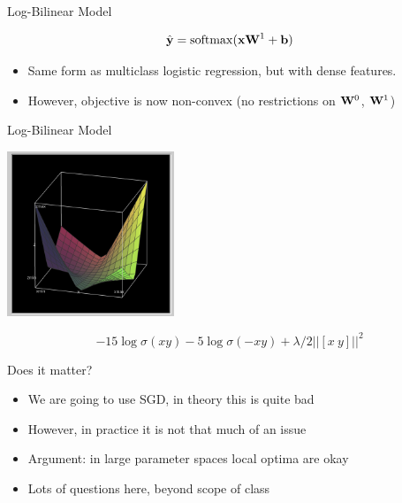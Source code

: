 \documentclass{beamer}
\begin{document}
\begin{frame}{Log-Bilinear Model}


  \[ \hat{\boldy} =  \softmax (\boldx \boldW^1 + \boldb) \]

  \begin{itemize}
  \item Same form as multiclass logistic regression, but with dense features.
  \item However, objective is now non-convex (no restrictions on $\mathbf{W}^0$, $\mathbf{W}^1$)
  \end{itemize}
\end{frame}

\begin{frame}{Log-Bilinear Model}
  \begin{center}
    \includegraphics[width=5cm]{logbilinear}
  \end{center}
  \[-15\log \sigma(xy)-5\log\sigma(-xy) + \lambda/2 ||[x\ y]||^2 \]

\end{frame}


\begin{frame}{Does it matter?}
  \begin{itemize}
  \item We are going to use SGD, in theory this is quite bad
    \air
  \item However, in practice it is not that much of an issue
    \air
  \item Argument: in large parameter spaces local optima are okay
    \air
  \item Lots of questions here, beyond scope of class
  \end{itemize}
\end{frame}
\end{document}
